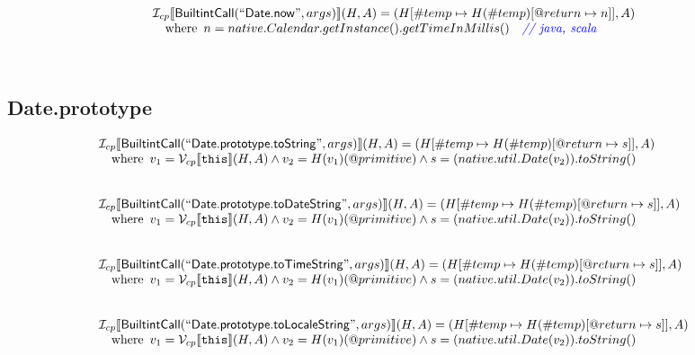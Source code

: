 \documentclass{article}
\newcommand{\SF}[1]{\mbox{\textsf{#1}}}
\newcommand{\TT}[1]{\mbox{\texttt{#1}}}
\newcommand{\comment}[1]{\textit{#1}}
\newcommand{\wherec}[1]{{\rm where}\begin{array}[t]{l}#1\end{array}}
\newcommand{\I}{\mathcal{I}}
\newcommand{\V}{\mathcal{V}}
\newcommand{\lbr}{\llbracket}
\newcommand{\rbr}{\rrbracket}
\def\inblue{\color{blue}}
\def\inblue{\color{blue}}
\begin{document}
\[\begin{array}{l}
\I _{cp}\lbr \SF{BuiltintCall}(``\SF{Date.now}",args)\rbr(H,A)
  = (H[\#temp \mapsto H(\#temp)[@return \mapsto n]], A)\\
\quad\wherec{
  n = native.Calendar.getInstance().getTimeInMillis() \quad\comment{{\inblue // java, scala}}\\
  }\\
\\\\
\end{array}
\]
\subsection{Date.prototype}
\[
\begin{array}{l}

\I _{cp}\lbr \SF{BuiltintCall}(``\SF{Date.prototype.toString}",args)\rbr(H,A)
  = (H[\#temp \mapsto H(\#temp)[@return \mapsto s]], A)\\
\quad\wherec{
  v_1 = \V _{cp}\lbr \TT{this}\rbr (H,A) \land v_2 = H(v_1)(@primitive)
  \land s = (native.util.Date(v_2)).toString()
  }\\
\\\\


\I _{cp}\lbr \SF{BuiltintCall}(``\SF{Date.prototype.toDateString}",args)\rbr(H,A)
  = (H[\#temp \mapsto H(\#temp)[@return \mapsto s]], A)\\
\quad\wherec{
  v_1 = \V _{cp}\lbr \TT{this}\rbr (H,A) \land v_2 = H(v_1)(@primitive)
  \land s = (native.util.Date(v_2)).toString()
  }\\
\\\\


\I _{cp}\lbr \SF{BuiltintCall}(``\SF{Date.prototype.toTimeString}",args)\rbr(H,A)
  = (H[\#temp \mapsto H(\#temp)[@return \mapsto s]], A)\\
\quad\wherec{
  v_1 = \V _{cp}\lbr \TT{this}\rbr (H,A) \land v_2 = H(v_1)(@primitive)
  \land s = (native.util.Date(v_2)).toString()
  }\\
\\\\


\I _{cp}\lbr \SF{BuiltintCall}(``\SF{Date.prototype.toLocaleString}",args)\rbr(H,A)
  = (H[\#temp \mapsto H(\#temp)[@return \mapsto s]], A)\\
\quad\wherec{
  v_1 = \V _{cp}\lbr \TT{this}\rbr (H,A) \land v_2 = H(v_1)(@primitive)
  \land s = (native.util.Date(v_2)).toString()
  }\\
\\\\



\end{array}\]
\end{document}
